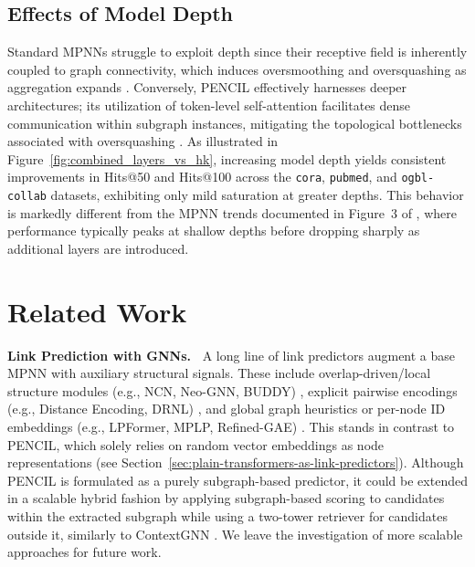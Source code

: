 \documentclass{article}
\theoremstyle{plain}
\theoremstyle{definition}
\theoremstyle{remark}
\begin{document}
\subsection{Effects of Model Depth}
Standard MPNNs struggle to exploit depth since their receptive field is inherently coupled to graph connectivity, which induces oversmoothing and oversquashing as aggregation expands \cite{li_deeper_2018, oono2020graph, alon2021on}. Conversely, PENCIL effectively harnesses deeper architectures; its utilization of token-level self-attention facilitates dense communication within subgraph instances, mitigating the topological bottlenecks associated with oversquashing \cite{topping2022understanding}. As illustrated in Figure~\ref{fig:combined_layers_vs_hk}, increasing model depth yields consistent improvements in Hits@50 and Hits@100 across the \texttt{cora}, \texttt{pubmed}, and \texttt{ogbl-collab} datasets, exhibiting only mild saturation at greater depths. 
This behavior is markedly different from the MPNN trends documented in Figure~3 of \cite{ma_reconsidering_2025}, where performance typically peaks at shallow depths before dropping sharply as additional layers are introduced.

\section{Related Work} \label{sec:related-work}

\textbf{Link Prediction with GNNs.~} A long line of link predictors augment a base MPNN with auxiliary structural signals. These include overlap-driven/local structure modules (e.g., NCN, Neo-GNN, BUDDY) \cite{wang2024neural,yun_neo-gnns_2021,chamberlain2023graph}, explicit pairwise encodings (e.g., Distance Encoding, DRNL) \cite{li_distance_2020,zhang_link_2018}, and global graph heuristics or per-node ID embeddings (e.g., LPFormer, MPLP, Refined-GAE) \cite{shomer_lpformer_2024,dong_pure_2024,ma_reconsidering_2025}. This stands in contrast to PENCIL, which solely relies on random vector embeddings as node representations (see Section~\ref{sec:plain-transformers-as-link-predictors}). Although PENCIL is formulated as a purely subgraph-based predictor, it could be extended in a scalable hybrid fashion by applying subgraph-based scoring to candidates within the extracted subgraph while using a two-tower retriever for candidates outside it, similarly to ContextGNN \cite{yuan_contextgnn_2025}. We leave the investigation of more scalable approaches for future work.
\end{document}
